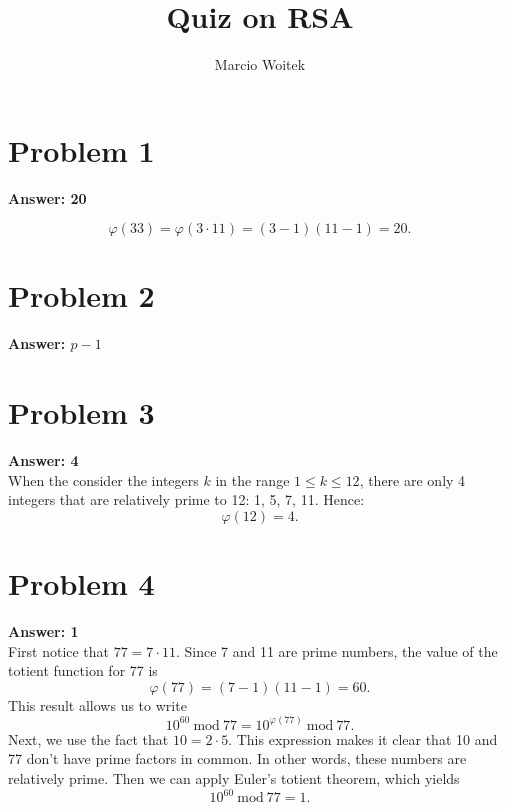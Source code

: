 \documentclass[11pt]{article}
\author{Marcio Woitek}
\date{}
\title{Quiz on RSA}
\newcommand{\Mod}[1]{\:\mathrm{mod}\:#1}
\begin{document}
\maketitle
\thispagestyle{empty}
\pagestyle{empty}

\section*{Problem 1}
\label{sec:org94ffc08}
\textbf{Answer: 20}

\begin{equation}
\varphi(33) = \varphi(3\cdot 11) = (3-1)(11-1) = 20.
\end{equation}

\section*{Problem 2}
\label{sec:orgd5e9c79}
\textbf{Answer: \(p-1\)}

\section*{Problem 3}
\label{sec:org41b959e}
\textbf{Answer: 4}\\[0pt]

When the consider the integers \(k\) in the range \(1\leq k\leq 12\), there are only 4
integers that are relatively prime to 12: 1, 5, 7, 11. Hence:
\begin{equation}
\varphi(12)=4.
\end{equation}

\section*{Problem 4}
\label{sec:org30bf22b}
\textbf{Answer: 1}\\[0pt]

First notice that \(77 = 7 \cdot 11\). Since 7 and 11 are prime numbers, the value
of the totient function for 77 is
\begin{equation}
\varphi(77) = (7 - 1) (11 - 1) = 60.
\end{equation}
This result allows us to write
\begin{equation*}
10^{60} \Mod 77 = 10^{\varphi(77)} \Mod 77.
\end{equation*}
Next, we use the fact that \(10 = 2 \cdot 5\). This expression makes it clear that
10 and 77 don't have prime factors in common. In other words, these numbers are
relatively prime. Then we can apply Euler's totient theorem, which yields
\begin{equation}
10^{60} \Mod 77 = 1.
\end{equation}
\end{document}
